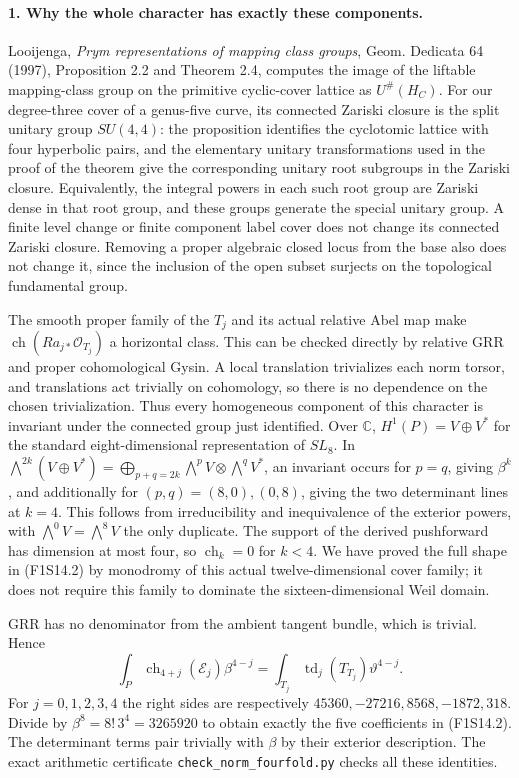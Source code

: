 \paragraph{1. Why the whole character has exactly these components.}
Looijenga, \emph{Prym representations of mapping class groups},
Geom. Dedicata 64 (1997), Proposition 2.2 and Theorem 2.4, computes the
image of the liftable mapping-class group on the primitive cyclic-cover
lattice as $U^\#(H_C)$. For our degree-three cover of a genus-five curve,
its connected Zariski closure is the split unitary group $SU(4,4)$:
the proposition identifies the cyclotomic lattice with four hyperbolic
pairs, and the elementary unitary transformations used in the proof of
the theorem give the corresponding unitary root subgroups in the
Zariski closure. Equivalently, the integral powers in each such root
group are Zariski dense in that root group, and these groups generate
the special unitary group. A finite level change or finite component
label cover does not change its connected Zariski closure. Removing a
proper algebraic closed locus from the base also does not change it,
since the inclusion of the open subset surjects on the topological
fundamental group.

The smooth proper family of the $T_j$ and its actual relative Abel map
make $\operatorname{ch}(Ra_{j*}\mathcal O_{T_j})$ a horizontal class.
This can be checked directly by relative GRR and proper cohomological
Gysin. A local translation trivializes each norm torsor, and translations
act trivially on cohomology, so there is no dependence on the chosen
trivialization. Thus every homogeneous component of this character is
invariant under the connected group just identified. Over $\mathbb C$,
$H^1(P)=V\oplus V^*$ for the standard eight-dimensional representation
of $SL_8$. In
$\bigwedge^{2k}(V\oplus V^*)=\bigoplus_{p+q=2k}\bigwedge^pV\otimes
\bigwedge^qV^*$, an invariant occurs for $p=q$, giving $\beta^k$,
and additionally for $(p,q)=(8,0),(0,8)$, giving the two determinant
lines at $k=4$. This follows from irreducibility and inequivalence of
the exterior powers, with $\bigwedge^0V=\bigwedge^8V$ the only duplicate.
The support of the derived pushforward has dimension at most four,
so $\operatorname{ch}_k=0$ for $k<4$. We have proved the full shape in
(F1S14.2) by monodromy of this actual twelve-dimensional cover family;
it does not require this family to dominate the sixteen-dimensional
Weil domain.

GRR has no denominator from the ambient tangent bundle, which is
trivial. Hence
\[
 \int_P\operatorname{ch}_{4+j}(\mathcal E_j)\beta^{4-j}
       =\int_{T_j}\operatorname{td}_j(T_{T_j})\vartheta^{4-j}.
 \tag{F1S14.3}
\]
For $j=0,1,2,3,4$ the right sides are respectively
$45360,-27216,8568,-1872,318$. Divide by
$\beta^8=8!\,3^4=3265920$ to obtain exactly the five coefficients in
(F1S14.2). The determinant terms pair trivially with $\beta$ by their
exterior description. The exact arithmetic certificate
\texttt{check\_norm\_fourfold.py} checks all these identities.


